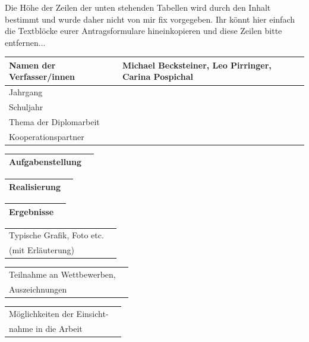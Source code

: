 Die Höhe der Zeilen der unten stehenden Tabellen wird durch den Inhalt bestimmt und wurde daher nicht von mir fix vorgegeben.
Ihr könnt hier einfach die Textblöcke eurer Antragsformulare hineinkopieren und diese Zeilen bitte entfernen...

\newlength{\feldC}
\newlength{\feldD}

\linespread{1.1} \normalsize
\begin{tabular}{|p{\feldC}|p{\feldD}|}
 \hline
 Namen der Verfasser/innen & Michael Becksteiner, Leo Pirringer, Carina Pospichal\\ 
 \hline 
 Jahrgang & \\ Schuljahr & \\
 \hline
 Thema der Diplomarbeit & \\
 \hline
 Kooperationspartner & \\
 \hline
\end{tabular}

\begin{tabular}{|p{\feldC}|p{\feldD}|}
 \hline
 Aufgabenstellung & \\
 \hline
\end{tabular}

\begin{tabular}{|p{\feldC}|p{\feldD}|}
 \hline
 Realisierung & \\
 \hline
\end{tabular}

\begin{tabular}{|p{\feldC}|p{\feldD}|}
 \hline
 Ergebnisse & \\
 \hline
\end{tabular}

\begin{tabular}{|p{\feldC}|p{\feldD}|}
 \hline
 Typische Grafik, Foto etc. & \\
  (mit Erläuterung) & \\
 \hline
\end{tabular}

\begin{tabular}{|p{\feldC}|p{\feldD}|}
 \hline
 Teilnahme an Wettbewerben, & \\
 Auszeichnungen & \\
 \hline
\end{tabular}

\begin{tabular}{|p{\feldC}|p{\feldD}|}
 \hline
 Möglichkeiten der Einsicht- & \\
 nahme in die Arbeit & \\
 \hline
\end{tabular}

